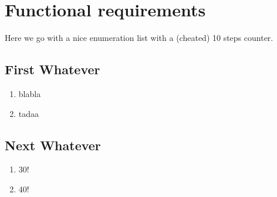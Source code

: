 \section{Functional requirements}

\renewcommand{\theenumi}{/F\arabic{enumi}0/}
\renewcommand{\labelenumi}{\theenumi}


Here we go with a nice enumeration list with a (cheated) 10 steps counter.

\subsection{First Whatever}

\begin{enumerate}
  \item blabla
  \item tadaa
\end{enumerate}

\subsection{Next Whatever}

\begin{enumerate}[resume]
  \item 30!
  \item 40!
\end{enumerate}